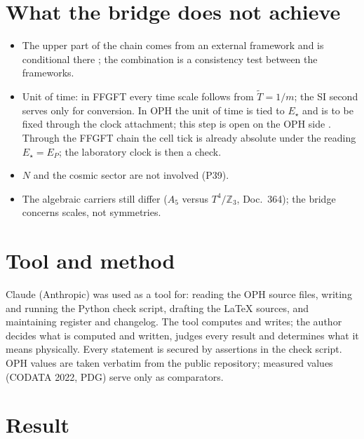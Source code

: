 \section{What the bridge does not achieve}

\begin{itemize}\itemsep2pt
\item The upper part of the chain comes from an external framework and is
  conditional there \QM; the combination is a consistency test between the
  frameworks.
\item Unit of time: in FFGFT every time scale follows from $\tilde T=1/m$; the
  SI second serves only for conversion. In OPH the unit of time is tied to
  $E_\star$ and is to be fixed through the clock attachment; this step is open
  on the OPH side \SM. Through the FFGFT chain the cell tick is already
  absolute under the reading $E_\star=E_P$; the laboratory clock is then a check.
\item $N$ and the cosmic sector are not involved (P39).
\item The algebraic carriers still differ ($A_5$ versus $T^4/\mathbb Z_3$,
  Doc.~364); the bridge concerns scales, not symmetries.
\end{itemize}

\section*{Tool and method}
Claude (Anthropic) was used as a tool for: reading the OPH source files,
writing and running the Python check script, drafting the \LaTeX{} sources,
and maintaining register and changelog. The tool computes and writes; the
author decides what is computed and written, judges every result and
determines what it means physically. Every statement is secured by assertions
in the check script. OPH values are taken verbatim from the public
repository; measured values (CODATA 2022, PDG) serve only as comparators.

\section{Result}

